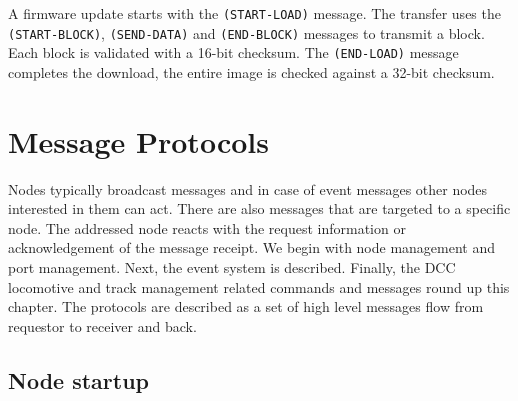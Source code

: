 \begin{table}[ht!]
    \centering 
    \caption{Firmware Update Messages}
\end{table}

A firmware update starts with the \texttt{(START-LOAD)} message. The transfer uses the \texttt{(START-BLOCK)}, \texttt{(SEND-DATA)} and \texttt{(END-BLOCK)} messages to transmit a block. Each block is validated with a 16-bit checksum. The \texttt{(END-LOAD)} message completes the download, the entire image is checked against a 32-bit checksum.

\section{Message Protocols}

Nodes typically broadcast messages and in case of event messages other nodes interested in them can act. There are also messages that are targeted to a specific node. The addressed node reacts with the request information or acknowledgement of the message receipt. We begin with node management and port management. Next, the event system is described. Finally, the DCC locomotive and track management related commands and messages round up this chapter. The protocols are described as a set of high level messages flow from requestor to receiver and back.

\subsection{Node startup}

